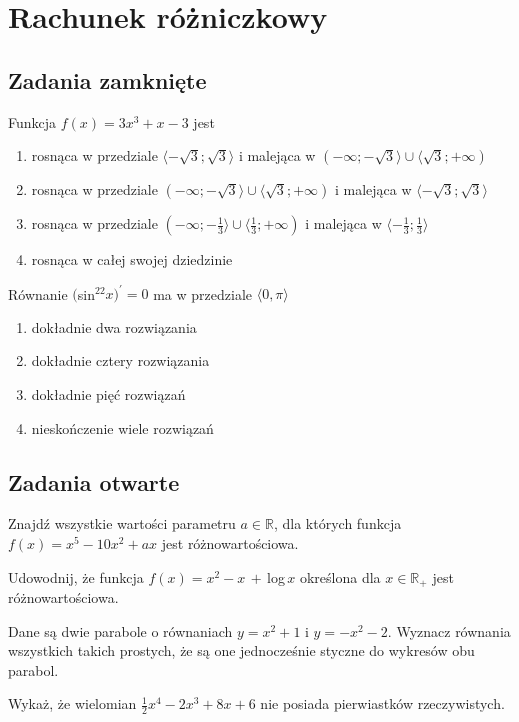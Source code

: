 \setcounter{parc}{0}
\addtocounter{chapc}{1}

\chapter{Rachunek różniczkowy}

\section{Zadania zamknięte}

\zadanie Funkcja $f(x) = 3x^3 + x - 3$ jest
\begin{enumerate}[label=\alph*)]
	\item rosnąca w przedziale $ \langle -\sqrt{3}; \sqrt{3} \rangle $ i malejąca w $ ( -\infty; -\sqrt{3} \rangle \cup \langle \sqrt{3}; +\infty ) $
	\item rosnąca w przedziale $ ( -\infty; -\sqrt{3} \rangle \cup \langle \sqrt{3}; +\infty ) $ i malejąca w $ \langle -\sqrt{3}; \sqrt{3} \rangle $
	\item rosnąca w przedziale $ ( -\infty; -\frac{1}{3} \rangle \cup \langle \frac{1}{3}; +\infty ) $ i malejąca w $ \langle -\frac{1}{3}; \frac{1}{3} \rangle $
	\item rosnąca w całej swojej dziedzinie
\end{enumerate}

\zadanie Równanie $($sin$^22x)^{'}=0$ ma w przedziale $\langle 0, \pi \rangle$
\begin{enumerate}[label=\alph*)]
	\item dokładnie dwa rozwiązania
	\item dokładnie cztery rozwiązania
	\item dokładnie pięć rozwiązań %
	\item nieskończenie wiele rozwiązań
\end{enumerate}

\section{Zadania otwarte}

\zadanie Znajdź wszystkie wartości parametru $a\in\mathbb{R}$, dla których funkcja $f(x) = x^5 - 10x^2 + ax$ jest różnowartościowa.

\zadanie Udowodnij, że funkcja $f(x) = x^2 - x\,+\,$log$\,x$ określona dla $x \in \mathbb{R}_+$ jest różnowartościowa.

\zadanie Dane są dwie parabole o równaniach $y = x^2 + 1$ i $y =-x^2 - 2$. Wyznacz równania wszystkich takich prostych, że są one jednocześnie styczne do wykresów obu parabol.

\zadanie Wykaż, że wielomian $ \frac{1}{2}x^4 - 2x^3 + 8x + 6 $ nie posiada pierwiastków rzeczywistych.